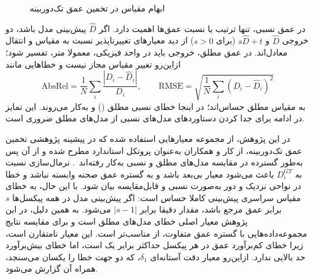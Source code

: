 \begin{figure}[htbp]
 \caption{ابهام مقیاس در تخمین عمق تک‌دوربینه}
 \label{fig:scale_ambiguity}

\end{figure}

در عمق نسبی، تنها ترتیب یا نسبت عمق‌ها اهمیت دارد. اگر $\hat D$ پیش‌بینی مدل باشد، دو خروجی $\hat D$ و $s\hat D+t$ (برای $s>0$) از دید معیارهای تغییرناپذیر نسبت به مقیاس و انتقال معادل‌اند. در عمق مطلق، خروجی باید در واحد فیزیکی، معمولا متر، تفسیر شود؛ ازاین‌رو تغییر مقیاس مجاز نیست و خطاهایی مانند
\begin{equation}
 \mathrm{AbsRel}=\frac{1}{N}\sum_i\frac{|D_i-\hat D_i|}{D_i},\qquad
 \mathrm{RMSE}=\sqrt{\frac{1}{N}\sum_i(D_i-\hat D_i)^2}
\end{equation}
به مقیاس مطلق حساس‌اند؛ در اینجا خطای نسبی مطلق () و  به‌کار می‌روند. این تمایز در ادامه برای جدا کردن دستاوردهای مدل‌های نسبی از مدل‌های مطلق ضروری است.

در این پژوهش، از مجموعه معیارهایی استفاده شده که در پیشینه پژوهشی تخمین عمق تک‌دوربینه، از کار  و همکاران به‌عنوان پروتکل استاندارد مطرح شده و از آن پس به‌طور گسترده در مقایسه مدل‌های مطلق و نسبی به‌کار رفته‌اند~\cite{Eigen2014Depth,Eigen2015Predicting}.
نرمال‌سازی نسبت به $D_i^{GT}$ باعث می‌شود معیار  بی‌بعد باشد و به گستره عمق صحنه وابسته نباشد و خطا در نواحی نزدیک و دور به‌صورت نسبی و قابل‌مقایسه بیان شود. با این حال،  به خطای مقیاس سراسری پیش‌بینی کاملا حساس است: اگر پیش‌بینی مدل در همه پیکسل‌ها $s$ برابر عمق مرجع باشد، مقدار  دقیقا برابر $|s-1|$ می‌شود. به همین دلیل،  در این پژوهش معیار اصلی خطای مدل‌های مطلق است و برای مقایسه نتایج مجموعه‌داده‌هایی با گستره عمق متفاوت، از  مناسب‌تر است. این معیار نامتقارن است، زیرا خطای کم‌برآورد عمق در هر پیکسل حداکثر برابر یک است، اما خطای بیش‌برآورد حد بالایی ندارد. ازاین‌رو معیار دقت آستانه‌ای $\delta_1$، که دو جهت خطا را یکسان می‌سنجد، همراه آن گزارش می‌شود.

